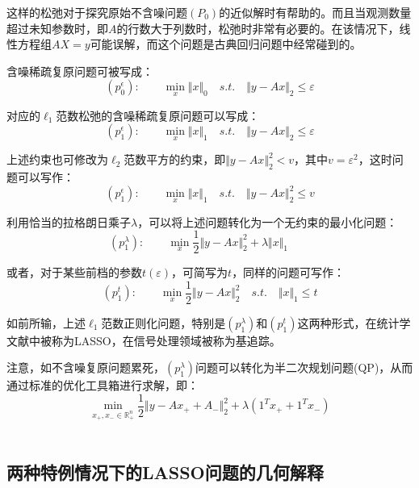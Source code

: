 这样的松弛对于探究原始不含噪问题$ (P_0) $的近似解时有帮助的。而且当观测数量超过未知参数时，即$ A $的行数大于列数时，松弛时非常有必要的。在该情况下，线性方程组$ AX=y $可能误解，而这个问题是古典回归问题中经常碰到的。

含噪稀疏复原问题可被写成：
\begin{equation}\label{key}
(p_{0}^{\epsilon}):\qquad \min_{x}\Vert x\Vert_0\quad s.t.\quad\Vert y-Ax\Vert_2\leq \varepsilon
\end{equation}

对应的$ \ell_1 $范数松弛的含噪稀疏复原问题可以写成：
\begin{equation}\label{key}
(p_{1}^{\epsilon}):\qquad \min_{x}\Vert x\Vert_1\quad s.t.\quad\Vert y-Ax\Vert_2\leq \varepsilon
\end{equation}

上述约束也可修改为$ \ell_2 $范数平方的约束，即$ \Vert y-Ax\Vert_2^2<v $，其中$ v=\varepsilon^2 $，这时问题可以写作：
\begin{equation}\label{key}
(p_{1}^{\epsilon}):\qquad \min_{x}\Vert x\Vert_1\quad s.t.\quad\Vert y-Ax\Vert_2^2\leq v
\end{equation}

利用恰当的拉格朗日乘子$ \lambda $，可以将上述问题转化为一个无约束的最小化问题：
\begin{equation}\label{key}
(p_{1}^{\lambda}):\qquad \min_{x} \dfrac{1}{2}\Vert y-Ax\Vert_2^2 + \lambda \Vert x\Vert_1 \qquad
\end{equation}

或者，对于某些前档的参数$ t(\varepsilon) $，可简写为$ t $，同样的问题可写作：
\begin{equation}\label{chapsrt01:p1t}
(p_{1}^{t}):\qquad \min_{x} \dfrac{1}{2}\Vert y-Ax\Vert_2^2 \quad s.t.\quad \Vert x\Vert_1 \leq t
\end{equation}

如前所输，{\heiti 上述$ \ell_1 $范数正则化问题，特别是$(p_{1}^{\lambda})$和$(p_{1}^{t})$这两种形式，在统计学文献中被称为LASSO，在信号处理领域被称为基追踪。}

注意，如不含噪复原问题累死，$ (p_{1}^{\lambda}) $问题可以转化为半二次规划问题(QP)，从而通过标准的优化工具箱进行求解，即：
\begin{equation}\label{key}
\min_{x_{+},x_{-}\in \mathbb{R}^{n}_{+}} \dfrac{1}{2}\Vert y-Ax_{+}+A_{-}\Vert_2^2 + \lambda (1^{T}x_{+}+1^{T}x_{-})
\end{equation}
　

\subsection{两种特例情况下的LASSO问题的几何解释}

